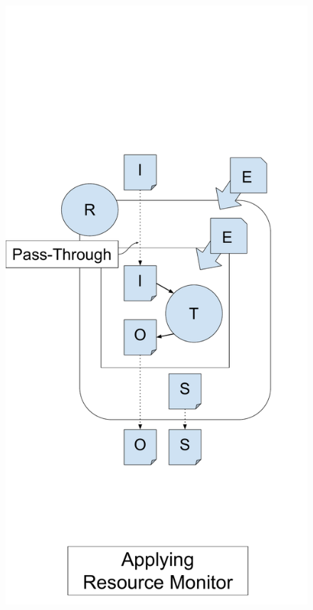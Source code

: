 \documentclass[conference]{IEEEtran}
\begin{document}
\begin{figure}[t]
\begin{minipage}[t]{0.18\textwidth}
  \includegraphics[width=\textwidth]{graphics/nested_sandbox_1_detail_wLlabel.pdf}
\end{minipage}
\begin{minipage}[t]{0.2\textwidth}

\end{minipage}
\end{figure}
\end{document}
